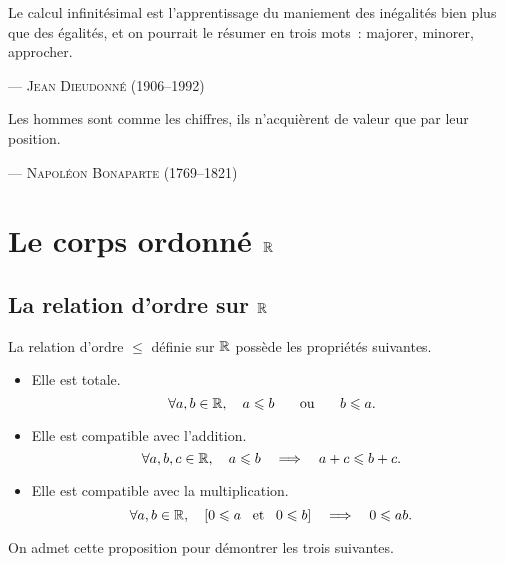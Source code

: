 \documentclass{magnolia}
\begin{document}
\setlength{}
\epigraph{\og Le calcul infinitésimal est l'apprentissage du maniement des inégalités bien plus que des égalités, et on pourrait le résumer en trois mots~: majorer, minorer, approcher.\fg}{--- \textsc{Jean Dieudonné (1906--1992)}}
\setlength{}
\epigraph{\og Les hommes sont comme les chiffres, ils n'acquièrent de valeur que par leur position.\fg}{--- \textsc{Napoléon Bonaparte (1769--1821)}}
\magtoc

\section{Le corps ordonné $\mathbb{R}$}

\subsection{La relation d'ordre sur $\mathbb{R}$}


\begin{proposition}[utile=-3]
La relation d'ordre $\leq$ définie sur $\mathbb{R}$ possède les propriétés suivantes.
\begin{itemize}
\item Elle est totale.
  \[\forall a,b\in\mathbb{R} ,\quad a\leqslant b \quad\quad\!\text{ou}\quad\!\quad b\leqslant a.\]
\item Elle est compatible avec l'addition.
  \[\forall a,b,c\in\mathbb{R} ,\quad a\leqslant b \quad\Longrightarrow\quad a+c\leqslant b+c.\]
\item Elle est compatible avec la multiplication.
  \[\forall a,b\in\mathbb{R} ,\quad \left[0\leqslant a \quad\!\text{et}\quad\! 0\leqslant b\right] \quad\Longrightarrow\quad 0\leqslant ab.\]
\end{itemize}
\end{proposition}

\begin{preuve}
On admet cette proposition pour démontrer les trois suivantes.
\end{preuve}
\end{document}
